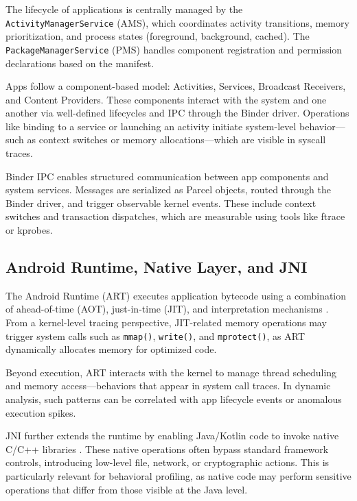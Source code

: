 \documentclass[a4paper,12pt]{report}
\begin{document}
The lifecycle of applications is centrally managed by the \texttt{ActivityManagerService} (AMS), which coordinates activity transitions, memory prioritization, and process states (foreground, background, cached). The \texttt{PackageManagerService} (PMS) handles component registration and permission declarations based on the manifest.

Apps follow a component-based model: Activities, Services, Broadcast Receivers, and Content Providers. These components interact with the system and one another via well-defined lifecycles and IPC through the Binder driver. Operations like binding to a service or launching an activity initiate system-level behavior—such as context switches or memory allocations—which are visible in syscall traces.

Binder IPC enables structured communication between app components and system services. Messages are serialized as Parcel objects, routed through the Binder driver, and trigger observable kernel events. These include context switches and transaction dispatches, which are measurable using tools like ftrace or kprobes.

\subsection{Android Runtime, Native Layer, and JNI}
The Android Runtime (ART) executes application bytecode using a combination of ahead-of-time (AOT), just-in-time (JIT), and interpretation mechanisms \cite{AOSPART}. From a kernel-level tracing perspective, JIT-related memory operations may trigger system calls such as \texttt{mmap()}, \texttt{write()}, and \texttt{mprotect()}, as ART dynamically allocates memory for optimized code.

Beyond execution, ART interacts with the kernel to manage thread scheduling and memory access—behaviors that appear in system call traces. In dynamic analysis, such patterns can be correlated with app lifecycle events or anomalous execution spikes.

JNI further extends the runtime by enabling Java/Kotlin code to invoke native C/C++ libraries \cite{AOSPJNI}. These native operations often bypass standard framework controls, introducing low-level file, network, or cryptographic actions. This is particularly relevant for behavioral profiling, as native code may perform sensitive operations that differ from those visible at the Java level.
\end{document}
